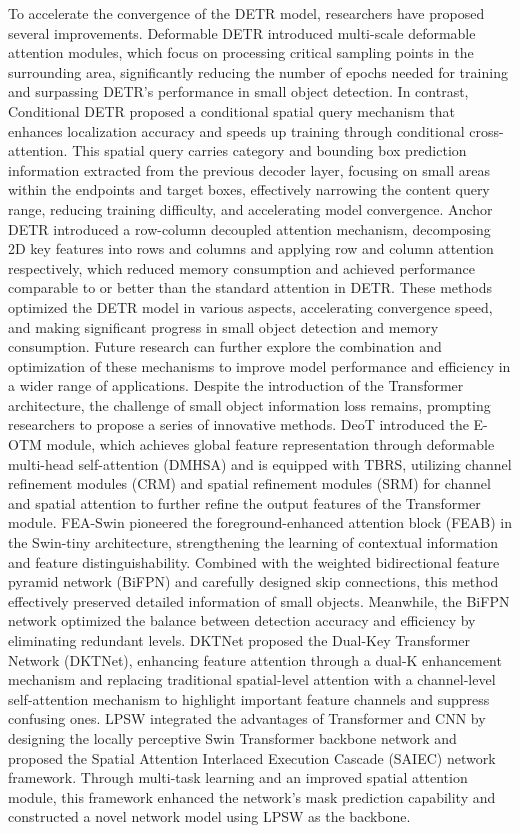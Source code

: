 \documentclass[journal]{IEEEtran}
\begin{document}
To accelerate the convergence of the DETR model, researchers have proposed several improvements. Deformable DETR introduced multi-scale deformable attention modules, which focus on processing critical sampling points in the surrounding area, significantly reducing the number of epochs needed for training and surpassing DETR's performance in small object detection. In contrast, Conditional DETR\cite{meng2021conditional} proposed a conditional spatial query mechanism that enhances localization accuracy and speeds up training through conditional cross-attention. This spatial query carries category and bounding box prediction information extracted from the previous decoder layer, focusing on small areas within the endpoints and target boxes, effectively narrowing the content query range, reducing training difficulty, and accelerating model convergence. Anchor DETR\cite{wang2022anchor} introduced a row-column decoupled attention mechanism, decomposing 2D key features into rows and columns and applying row and column attention respectively, which reduced memory consumption and achieved performance comparable to or better than the standard attention in DETR. These methods optimized the DETR model in various aspects, accelerating convergence speed, and making significant progress in small object detection and memory consumption. Future research can further explore the combination and optimization of these mechanisms to improve model performance and efficiency in a wider range of applications. Despite the introduction of the Transformer architecture, the challenge of small object information loss remains, prompting researchers to propose a series of innovative methods. DeoT\cite{ding2023deot} introduced the E-OTM module, which achieves global feature representation through deformable multi-head self-attention (DMHSA) and is equipped with TBRS, utilizing channel refinement modules (CRM) and spatial refinement modules (SRM) for channel and spatial attention to further refine the output features of the Transformer module. FEA-Swin\cite{xu2022fea} pioneered the foreground-enhanced attention block (FEAB) in the Swin-tiny architecture, strengthening the learning of contextual information and feature distinguishability. Combined with the weighted bidirectional feature pyramid network (BiFPN) and carefully designed skip connections, this method effectively preserved detailed information of small objects. Meanwhile, the BiFPN network optimized the balance between detection accuracy and efficiency by eliminating redundant levels. DKTNet\cite{xu2023dktnet} proposed the Dual-Key Transformer Network (DKTNet), enhancing feature attention through a dual-K enhancement mechanism and replacing traditional spatial-level attention with a channel-level self-attention mechanism to highlight important feature channels and suppress confusing ones. LPSW\cite{xu2021improved} integrated the advantages of Transformer and CNN by designing the locally perceptive Swin Transformer\cite{liu2021swin} backbone network and proposed the Spatial Attention Interlaced Execution Cascade (SAIEC) network framework. Through multi-task learning and an improved spatial attention module, this framework enhanced the network's mask prediction capability and constructed a novel network model using LPSW as the backbone.
\end{document}
